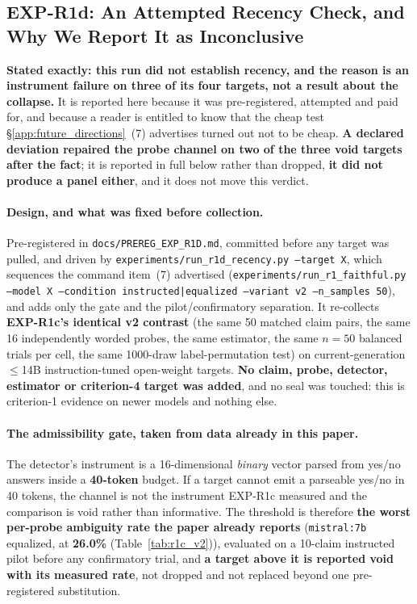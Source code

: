 \subsection{EXP-R1d: An Attempted Recency Check, and Why We Report It as Inconclusive}
\label{app:r1d}

\textbf{Stated exactly: this run did not establish recency, and the reason is an instrument failure on three of its four targets, not a result about the collapse.} It is reported here because it was pre-registered, attempted and paid for, and because a reader is entitled to know that the cheap test §\ref{app:future_directions}~(7) advertises turned out not to be cheap. \textbf{A declared deviation repaired the probe channel on two of the three void targets after the fact}; it is reported in full below rather than dropped, \textbf{it did not produce a panel either}, and it does not move this verdict.

\paragraph{Design, and what was fixed before collection.} Pre-registered in \texttt{docs/PREREG\_EXP\_R1D.md}, committed before any target was pulled, and driven by \texttt{experiments/run\_r1d\_recency.py --target X}, which sequences the command item~(7) advertised (\texttt{experiments/run\_r1\_faithful.py --model X --condition instructed|equalized --variant v2 --n\_samples 50}), and adds only the gate and the pilot/confirmatory separation. It re-collects \textbf{EXP-R1c's identical v2 contrast} (the same 50 matched claim pairs, the same 16 independently worded probes, the same estimator, the same $n=50$ balanced trials per cell, the same 1000-draw label-permutation test) on current-generation $\leq$14B instruction-tuned open-weight targets. \textbf{No claim, probe, detector, estimator or criterion-4 target was added}, and no seal was touched: this is criterion-1 evidence on newer models and nothing else.

\paragraph{The admissibility gate, taken from data already in this paper.} The detector's instrument is a 16-dimensional \emph{binary} vector parsed from yes/no answers inside a \textbf{40-token} budget. If a target cannot emit a parseable yes/no in 40 tokens, the channel is not the instrument EXP-R1c measured and the comparison is void rather than informative. The threshold is therefore \textbf{the worst per-probe ambiguity rate the paper already reports} (\texttt{mistral:7b} equalized, at \textbf{26.0\%} (Table~\ref{tab:r1c_v2})), evaluated on a 10-claim instructed pilot before any confirmatory trial, and \textbf{a target above it is reported void with its measured rate}, not dropped and not replaced beyond one pre-registered substitution.

